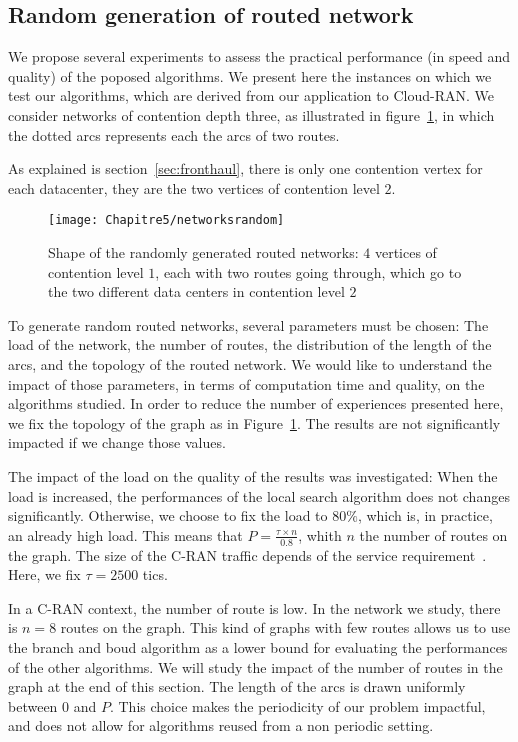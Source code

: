 \subsection{Random generation of routed network}

We propose several experiments to assess the practical performance (in speed and quality) of the poposed algorithms. We present here the instances on which we test our algorithms, which are derived from our application to Cloud-RAN. We consider networks of contention depth three, as illustrated in figure~\ref{fig:randomnetworks}, in which the dotted arcs represents each the arcs of two routes. 

As explained is section~\ref{sec:fronthaul}, there is only one contention vertex for each datacenter, they are the two vertices of contention level $2$.
   \begin{figure} 
	\centering
	\texttt{[image: Chapitre5/networksrandom]}

\caption{Shape of the randomly generated routed networks: $4$ vertices of contention level $1$, each with two routes going through, which go to the two different data centers in contention level $2$}
\label{fig:randomnetworks}
\end{figure}

To generate random routed networks, several parameters must be chosen: The load of the network, the number of routes, the distribution of the length of the arcs, and the topology of the routed network. We would like to understand the impact of those parameters, in terms of computation time and quality, on the algorithms studied. In order to reduce the number of experiences presented here, we fix the topology of the graph as in Figure~\ref{fig:randomnetworks}. The results are not significantly impacted if we change those values. 

 
 The impact of the load on the quality of the results was investigated: When the load is increased, the performances of the local search algorithm does not changes significantly. Otherwise, we choose to fix the load to $80\%$, which is, in practice, an already high load. This means that $P = \frac{\tau \times n}{0.8}$, whith $n$ the number of routes on the graph. The size of the C-RAN traffic depends of the service requirement~\cite{mobile2011c}. Here, we fix $\tau = 2500$ tics.
  
In a C-RAN context, the number of route is low. In the network we study, there is $n=8$ routes on the graph. This kind of graphs with few routes allows us to use the branch and boud algorithm as a lower bound for evaluating the performances of the other algorithms. We will study the impact of the number of routes in the graph at the end of this section. The length of the arcs is drawn uniformly between $0$ and $P$. This choice makes the periodicity of our problem impactful, and does not allow for algorithms reused from a non periodic setting.



